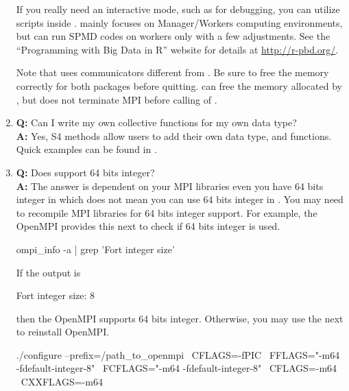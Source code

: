 \begin{enumerate}
      If you really need an interactive mode, such as for debugging,
      you can utilize  scripts inside
      .  mainly focuses on Manager/Workers
      computing environments, but can run SPMD codes on workers only
      with a few adjustments. See the ``Programming with Big Data in R''
      website for details at \url{http://r-pbd.org/}.

      Note that  uses communicators different from
      .  Be sure to free the memory correctly for both
      packages before quitting. 
      can free the memory allocated by , but does not
      terminate MPI before calling  of .

\item {\bf\color{blue} Q:}
      Can I write my own collective functions for my own data type? \\
      {\bf\color{blue} A:}
      Yes, S4 methods allow users to add their own data type, and functions.
      Quick examples can be found in .

\item {\bf\color{blue} Q:}
      Does  support 64 bits integer? \\
      {\bf\color{blue} A:}
      The answer is dependent on your MPI libraries even you have 64 bits
      integer in  which does not mean you can use 64 bits integer
      in . You may need to recompile MPI libraries for 64 bits
      integer support. For example, the OpenMPI provides this next to check if
      64 bits integer is used.
\begin{Command}
ompi_info -a | grep 'Fort integer size'
\end{Command}
      If the output is
\begin{Command}
       Fort integer size: 8
\end{Command}
       then the OpenMPI supports 64 bits integer. Otherwise, you may use the
       next to reinstall OpenMPI.
\begin{Command}
./configure --prefix=/path_to_openmpi \
            CFLAGS=-fPIC \
            FFLAGS="-m64 -fdefault-integer-8" \
            FCFLAGS="-m64 -fdefault-integer-8" \
            CFLAGS=-m64 \
            CXXFLAGS=-m64
\end{Command}
      
\end{enumerate}


